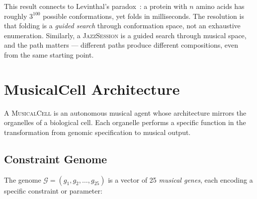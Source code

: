 \documentclass[11pt,a4paper]{article}
\newcommand{\MusicalCell}{\textsc{MusicalCell}}
\newcommand{\JazzSession}{\textsc{JazzSession}}
\newcommand{\calG}{\mathcal{G}}
\begin{document}
This result connects to Levinthal's paradox~\citep{levinthal1969}: a protein with $n$ amino acids has roughly $3^{100}$ possible conformations, yet folds in milliseconds. The resolution is that folding is a \emph{guided search} through conformation space, not an exhaustive enumeration. Similarly, a \JazzSession{} is a guided search through musical space, and the path matters --- different paths produce different compositions, even from the same starting point.

\section{MusicalCell Architecture}\label{sec:musicalcell}

A \MusicalCell{} is an autonomous musical agent whose architecture mirrors the organelles of a biological cell. Each organelle performs a specific function in the transformation from genomic specification to musical output.

\subsection{Constraint Genome}

The genome $\calG = (g_1, g_2, \ldots, g_{25})$ is a vector of 25 \emph{musical genes}, each encoding a specific constraint or parameter:
\end{document}
